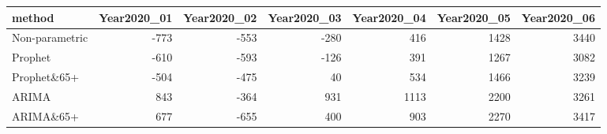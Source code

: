 \begin{table}[ht]
\centering
\begin{tabular}{lrrrrrr}
  \hline
method & Year2020\_01 & Year2020\_02 & Year2020\_03 & Year2020\_04 & Year2020\_05 & Year2020\_06 \\ 
  \hline
Non-parametric & -773 & -553 & -280 & 416 & 1428 & 3440 \\ 
  Prophet & -610 & -593 & -126 & 391 & 1267 & 3082 \\ 
  Prophet\&65+ & -504 & -475 & 40 & 534 & 1466 & 3239 \\ 
  ARIMA & 843 & -364 & 931 & 1113 & 2200 & 3261 \\ 
  ARIMA\&65+ & 677 & -655 & 400 & 903 & 2270 & 3417 \\ 
   \hline
\end{tabular}
\end{table}
